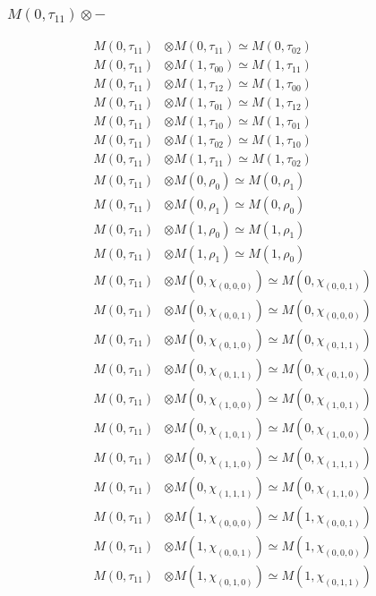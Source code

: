 \subsubsection{$ M(0,\tau_{11})\otimes -$}
\begin{align*}
M(0,\tau_{11}) &\otimes M(0,\tau_{11}) \simeq M(0,\tau_{02}) \\
M(0,\tau_{11}) &\otimes M(1,\tau_{00}) \simeq M(1,\tau_{11}) \\
M(0,\tau_{11}) &\otimes M(1,\tau_{12}) \simeq M(1,\tau_{00}) \\
M(0,\tau_{11}) &\otimes M(1,\tau_{01}) \simeq M(1,\tau_{12}) \\
M(0,\tau_{11}) &\otimes M(1,\tau_{10}) \simeq M(1,\tau_{01}) \\
M(0,\tau_{11}) &\otimes M(1,\tau_{02}) \simeq M(1,\tau_{10}) \\
M(0,\tau_{11}) &\otimes M(1,\tau_{11}) \simeq M(1,\tau_{02}) \\
M(0,\tau_{11}) &\otimes M(0,\rho_{0}) \simeq M(0,\rho_{1}) \\
M(0,\tau_{11}) &\otimes M(0,\rho_{1}) \simeq M(0,\rho_{0}) \\
M(0,\tau_{11}) &\otimes M(1,\rho_{0}) \simeq M(1,\rho_{1}) \\
M(0,\tau_{11}) &\otimes M(1,\rho_{1}) \simeq M(1,\rho_{0}) \\
M(0,\tau_{11}) &\otimes M(0,\chi_{(0,0,0)}) \simeq M(0,\chi_{(0,0,1)}) \\
M(0,\tau_{11}) &\otimes M(0,\chi_{(0,0,1)}) \simeq M(0,\chi_{(0,0,0)}) \\
M(0,\tau_{11}) &\otimes M(0,\chi_{(0,1,0)}) \simeq M(0,\chi_{(0,1,1)}) \\
M(0,\tau_{11}) &\otimes M(0,\chi_{(0,1,1)}) \simeq M(0,\chi_{(0,1,0)}) \\
M(0,\tau_{11}) &\otimes M(0,\chi_{(1,0,0)}) \simeq M(0,\chi_{(1,0,1)}) \\
M(0,\tau_{11}) &\otimes M(0,\chi_{(1,0,1)}) \simeq M(0,\chi_{(1,0,0)}) \\
M(0,\tau_{11}) &\otimes M(0,\chi_{(1,1,0)}) \simeq M(0,\chi_{(1,1,1)}) \\
M(0,\tau_{11}) &\otimes M(0,\chi_{(1,1,1)}) \simeq M(0,\chi_{(1,1,0)}) \\
M(0,\tau_{11}) &\otimes M(1,\chi_{(0,0,0)}) \simeq M(1,\chi_{(0,0,1)}) \\
M(0,\tau_{11}) &\otimes M(1,\chi_{(0,0,1)}) \simeq M(1,\chi_{(0,0,0)}) \\
M(0,\tau_{11}) &\otimes M(1,\chi_{(0,1,0)}) \simeq M(1,\chi_{(0,1,1)}) \\

\end{align*}
